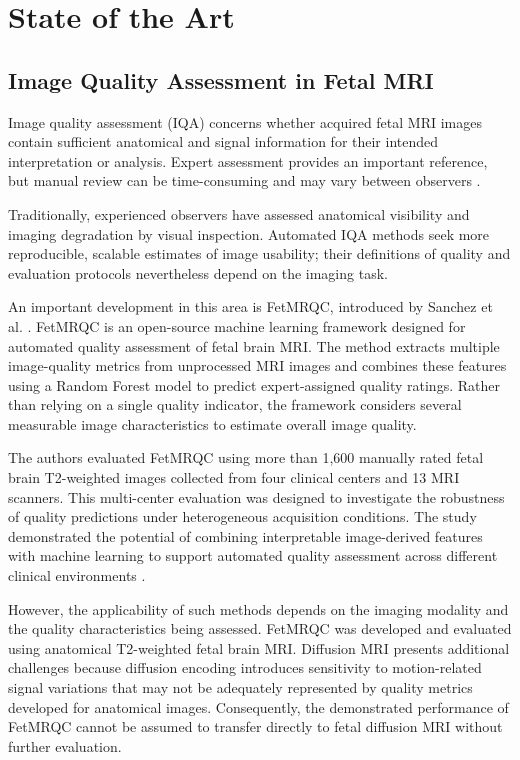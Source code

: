 \chapter{State of the Art}
\section{Image Quality Assessment in Fetal MRI}

Image quality assessment (IQA) concerns whether acquired fetal MRI images contain sufficient anatomical and signal information for their intended interpretation or analysis. Expert assessment provides an important reference, but manual review can be time-consuming and may vary between observers \autocite{malamateniou2013motion}.

Traditionally, experienced observers have assessed anatomical visibility and imaging degradation by visual inspection. Automated IQA methods seek more reproducible, scalable estimates of image usability; their definitions of quality and evaluation protocols nevertheless depend on the imaging task.

An important development in this area is FetMRQC, introduced by Sanchez et al. \autocite{sanchez2024fetmrqc}. FetMRQC is an open-source machine learning framework designed for automated quality assessment of fetal brain MRI. The method extracts multiple image-quality metrics from unprocessed MRI images and combines these features using a Random Forest model to predict expert-assigned quality ratings. Rather than relying on a single quality indicator, the framework considers several measurable image characteristics to estimate overall image quality.

The authors evaluated FetMRQC using more than 1,600 manually rated fetal brain T2-weighted images collected from four clinical centers and 13 MRI scanners. This multi-center evaluation was designed to investigate the robustness of quality predictions under heterogeneous acquisition conditions. The study demonstrated the potential of combining interpretable image-derived features with machine learning to support automated quality assessment across different clinical environments \autocite{sanchez2024fetmrqc}.

However, the applicability of such methods depends on the imaging modality and the quality characteristics being assessed. FetMRQC was developed and evaluated using anatomical T2-weighted fetal brain MRI. Diffusion MRI presents additional challenges because diffusion encoding introduces sensitivity to motion-related signal variations that may not be adequately represented by quality metrics developed for anatomical images. Consequently, the demonstrated performance of FetMRQC cannot be assumed to transfer directly to fetal diffusion MRI without further evaluation.

